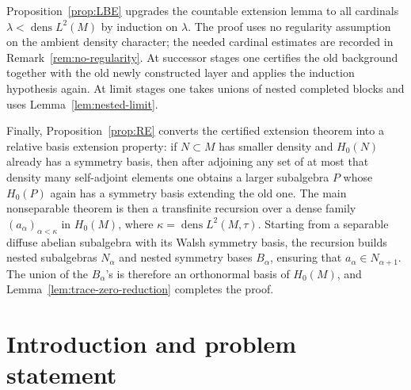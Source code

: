 \documentclass[11pt,letterpaper,reqno]{amsart}
\theoremstyle{definition}
\numberwithin{equation}{section}
\DeclareMathOperator{\dens}{dens}
\begin{document}
Proposition~\ref{prop:LBE} upgrades the countable extension lemma to all
cardinals $\lambda<\dens L^2(M)$ by induction on $\lambda$.  The proof uses no
regularity assumption on the ambient density character; the needed cardinal
estimates are recorded in Remark~\ref{rem:no-regularity}.  At successor stages
one certifies the old background together with the old newly constructed layer
and applies the induction hypothesis again.  At limit stages one takes unions
of nested completed blocks and uses Lemma~\ref{lem:nested-limit}.

Finally, Proposition~\ref{prop:RE} converts the certified extension theorem
into a relative basis extension property: if $N\subset M$ has smaller density
and $H_0(N)$ already has a symmetry basis, then after adjoining any set of at
most that density many self-adjoint elements one obtains a larger subalgebra
$P$ whose $H_0(P)$ again has a symmetry basis extending the old one.  The main
nonseparable theorem is then a transfinite recursion over a dense family
$(a_\alpha)_{\alpha<\kappa}$ in $H_0(M)$, where
$\kappa=\dens L^2(M,\tau)$.  Starting from a separable diffuse abelian
subalgebra with its Walsh symmetry basis, the recursion builds nested
subalgebras $N_\alpha$ and nested symmetry bases $B_\alpha$, ensuring that
$a_\alpha\in N_{\alpha+1}$.  The union of the $B_\alpha$'s is therefore an
orthonormal basis of $H_0(M)$, and Lemma~\ref{lem:trace-zero-reduction}
completes the proof.







\section{Introduction and problem statement}\label{sec:introduction}
\end{document}
